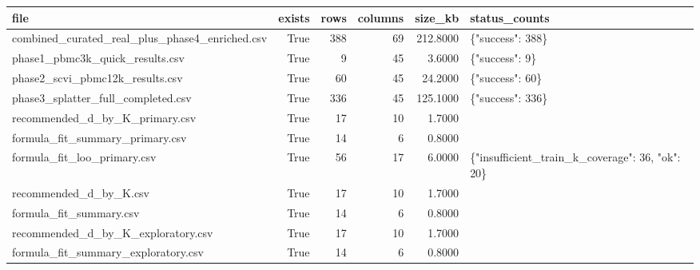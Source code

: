 \begin{tabular}{lrrrrl}
\toprule
file & exists & rows & columns & size\_kb & status\_counts \\
\midrule
combined\_curated\_real\_plus\_phase4\_enriched.csv & True & 388 & 69 & 212.8000 & \{"success": 388\} \\
phase1\_pbmc3k\_quick\_results.csv & True & 9 & 45 & 3.6000 & \{"success": 9\} \\
phase2\_scvi\_pbmc12k\_results.csv & True & 60 & 45 & 24.2000 & \{"success": 60\} \\
phase3\_splatter\_full\_completed.csv & True & 336 & 45 & 125.1000 & \{"success": 336\} \\
recommended\_d\_by\_K\_primary.csv & True & 17 & 10 & 1.7000 &  \\
formula\_fit\_summary\_primary.csv & True & 14 & 6 & 0.8000 &  \\
formula\_fit\_loo\_primary.csv & True & 56 & 17 & 6.0000 & \{"insufficient\_train\_k\_coverage": 36, "ok": 20\} \\
recommended\_d\_by\_K.csv & True & 17 & 10 & 1.7000 &  \\
formula\_fit\_summary.csv & True & 14 & 6 & 0.8000 &  \\
recommended\_d\_by\_K\_exploratory.csv & True & 17 & 10 & 1.7000 &  \\
formula\_fit\_summary\_exploratory.csv & True & 14 & 6 & 0.8000 &  \\
\bottomrule
\end{tabular}
